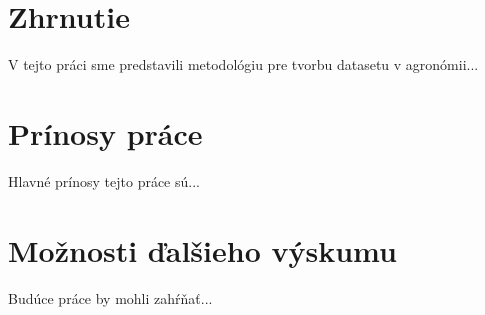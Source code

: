 \section{Zhrnutie}

V tejto práci sme predstavili metodológiu pre tvorbu datasetu v agronómii...

\section{Prínosy práce}

Hlavné prínosy tejto práce sú...

\section{Možnosti ďalšieho výskumu}

Budúce práce by mohli zahŕňať...
